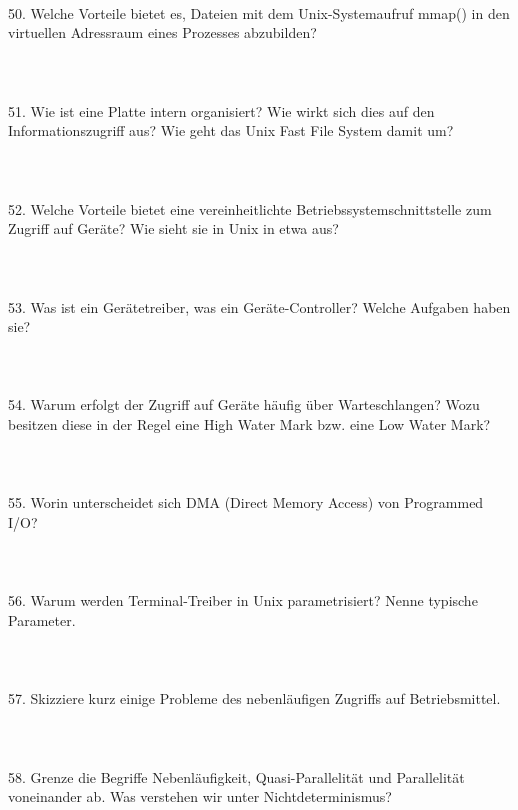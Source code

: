 \documentclass{article}
\begin{document}
\\
50. Welche Vorteile bietet es, Dateien mit dem Unix-Systemaufruf mmap() in den virtuellen
Adressraum eines Prozesses abzubilden?
\\
\\
\\
\\
51. Wie ist eine Platte intern organisiert? Wie wirkt sich dies auf den Informationszugriff aus?
Wie geht das Unix Fast File System damit um?
\\
\\
\\
\\
52. Welche Vorteile bietet eine vereinheitlichte Betriebssystemschnittstelle zum Zugriff auf
Geräte? Wie sieht sie in Unix in etwa aus?
\\
\\
\\
\\
53. Was ist ein Gerätetreiber, was ein Geräte-Controller? Welche Aufgaben haben sie?
\\
\\
\\
\\
54. Warum erfolgt der Zugriff auf Geräte häufig über Warteschlangen? Wozu besitzen diese in
der Regel eine High Water Mark bzw. eine Low Water Mark?
\\
\\
\\
\\
55. Worin unterscheidet sich DMA (Direct Memory Access) von Programmed I/O?
\\
\\
\\
\\
56. Warum werden Terminal-Treiber in Unix parametrisiert? Nenne typische Parameter.
\\
\\
\\
\\
57. Skizziere kurz einige Probleme des nebenläufigen Zugriffs auf Betriebsmittel.
\\
\\
\\
\\
58. Grenze die Begriffe Nebenläufigkeit, Quasi-Parallelität und Parallelität voneinander ab.
Was verstehen wir unter Nichtdeterminismus?
\\
\\
\\
\\
\end{document}
